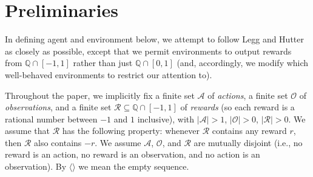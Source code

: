 \documentclass{article}
\begin{document}
\section{Preliminaries}
\label{prelimsecn}

In defining agent and environment below, we attempt to follow
Legg and Hutter \cite{legg2007universal} as closely as possible,
except that we permit environments to output rewards from $\mathbb Q \cap [-1,1]$
rather than just $\mathbb Q\cap [0,1]$ (and, accordingly, we modify which well-behaved
environments to restrict our attention to).

Throughout the paper, we implicitly
fix a finite set $\mathcal A$ of \emph{actions},
a finite set $\mathcal O$ of \emph{observations},
and a finite set $\mathcal R\subseteq \mathbb Q\cap [-1,1]$ of \emph{rewards}
(so each reward is a rational number between $-1$ and $1$ inclusive),
with $|\mathcal A|>1$,
$|\mathcal O|>0$, $|\mathcal R|>0$.
We assume that $\mathcal R$ has the following property:
whenever $\mathcal R$ contains any reward $r$, then $\mathcal R$
also contains $-r$.
We assume $\mathcal A$, $\mathcal O$, and $\mathcal R$ are mutually disjoint
(i.e., no reward is an action, no reward is an observation, and no action is an
observation).
By $\langle\rangle$ we mean the empty sequence.
\end{document}
